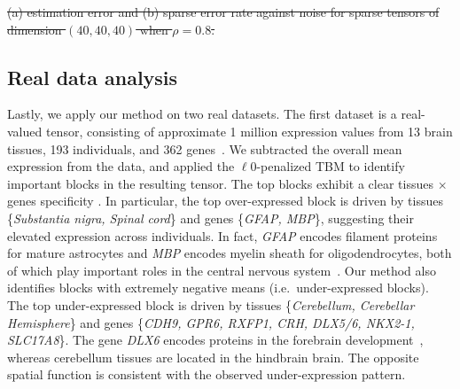 \documentclass[11pt]{article}
\theoremstyle{plain}
\theoremstyle{definition}
\providecommand{\DIFaddtex}[1]{{\protect\color{blue}\uwave{#1}}} %
\providecommand{\DIFdeltex}[1]{{\protect\color{red}\sout{#1}}}                      %
\providecommand{\DIFaddbegin}{} %
\providecommand{\DIFaddend}{} %
\providecommand{\DIFdelbegin}{} %
\providecommand{\DIFdelend}{} %
\providecommand{\DIFdelFL}[1]{\DIFdel{#1}} %
\providecommand{\DIFadd}[1]{\texorpdfstring{\DIFaddtex{#1}}{#1}} %
\providecommand{\DIFdel}[1]{\texorpdfstring{\DIFdeltex{#1}}{}} %
\begin{document}
\DIFdelbegin %
{%
\DIFdelFL{(a) estimation error and (b) sparse error rate against noise for sparse tensors of dimension $(40,40,40)$ when $\rho=0.8$. }}%

\DIFdelend \DIFaddbegin \vspace{-.3cm}
\DIFaddend \subsection{Real data analysis}
\DIFaddbegin \vspace{-.05cm}
\DIFaddend Lastly, we apply our method on two real datasets. %
The first dataset is a real-valued tensor, consisting of approximate 1 million expression values from 13 brain tissues, 193 individuals, and 362 genes~\cite{wang2017three}. We subtracted the overall mean expression from the data, and applied the $\ell0$-penalized TBM to identify important blocks in the resulting tensor. The top blocks exhibit a clear tissues $\times$ genes specificity \DIFaddbegin \DIFadd{(Supplementary Table~\ref{tab:gene})}\DIFaddend . In particular, the top over-expressed block is driven by tissues \{\emph{Substantia nigra, Spinal cord}\} and genes \{\emph{GFAP, MBP}\}, suggesting their elevated expression across individuals. In fact, \emph{GFAP} encodes filament proteins for mature astrocytes and \emph{MBP} encodes myelin sheath for oligodendrocytes, both of which play important roles in the central nervous system~\cite{o2015reference}. Our method also identifies blocks with extremely negative means (i.e.\ under-expressed blocks). The top under-expressed block is driven by tissues \{\emph{Cerebellum, Cerebellar Hemisphere}\} and genes \{\emph{CDH9, GPR6, RXFP1, CRH, DLX5/6, NKX2-1, SLC17A8}\}. The gene \emph{DLX6} encodes proteins in the forebrain development~\cite{o2015reference}, whereas cerebellum tissues are located in the hindbrain brain. The opposite spatial function is consistent with the observed under-expression pattern. 
\end{document}
